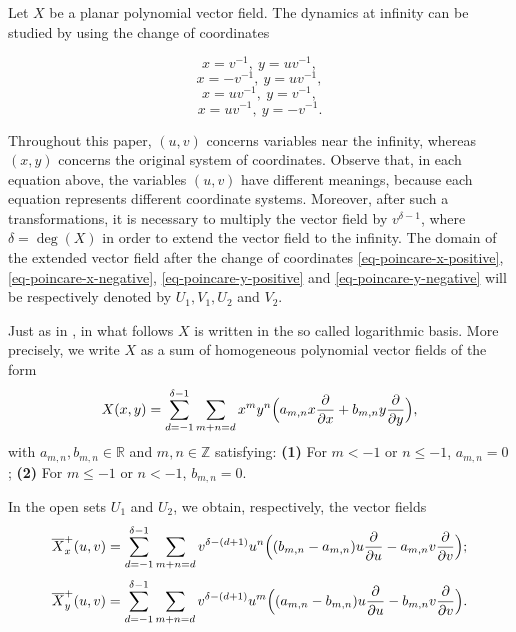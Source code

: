 \documentclass[12pt]{amsart}
\begin{document}
Let $X$ be a planar polynomial vector field. The dynamics at infinity can be studied by using the change of coordinates \begin{multicols}{2} \noindent\begin{equation}\label{eq-poincare-x-positive}
x = v^{-1}, \ y = uv^{-1},
\end{equation}
\begin{equation}\label{eq-poincare-x-negative}
x = -v^{-1}, \ y = uv^{-1},
\end{equation}
\begin{equation}\label{eq-poincare-y-positive}
x = uv^{-1}, \ y = v^{-1},
\end{equation}
\begin{equation}\label{eq-poincare-y-negative}
x = uv^{-1}, \ y = -v^{-1}.
\end{equation}\end{multicols}

Throughout this paper, $(u,v)$ concerns variables near the infinity, whereas $(x,y)$ concerns the original system of coordinates. Observe that, in each equation above, the variables $(u,v)$ have different meanings, because each equation represents different coordinate systems. Moreover, after such a transformations, it is necessary to multiply the vector field by $v^{\delta-1}$, where $\delta = \operatorname{deg}(X)$ in order to extend the vector field to the infinity. The domain of the extended vector field after the change of coordinates \eqref{eq-poincare-x-positive}, \eqref{eq-poincare-x-negative}, \eqref{eq-poincare-y-positive} and \eqref{eq-poincare-y-negative} will be respectively denoted by $U_{1}, V_{1}, U_{2}$ and $V_{2}$.

Just as in \cite{Panazzolo}, in what follows $X$ is written in the so called logarithmic basis. More precisely, we write $X$ as a sum of homogeneous polynomial vector fields of the form
$$X(x,y) = \displaystyle\sum_{d=-1}^{\delta -1}\sum_{m+n=d} x^{m}y^{n}\Big{(}a_{m,n}x\displaystyle\frac{\partial}{\partial x} + b_{m,n}y\displaystyle\frac{\partial}{\partial y}\Big{)},$$
with $a_{m,n},b_{m,n}\in\mathbb{R}$ and $m,n\in \mathbb{Z}$ satisfying: \textbf{(1)} For $m < -1$ or $n \leq -1$, $a_{m,n} = 0$; \textbf{(2) }For $m \leq -1$ or $n < -1$, $b_{m,n} = 0$. 


In the open sets $U_{1}$ and $U_{2}$, we obtain, respectively, the vector fields
\begin{equation}\label{eq-poincare-x-positive-vf}
\overline{X}_{x}^{+}(u,v) = \displaystyle\sum_{d=-1}^{\delta -1}\sum_{m+n=d} v^{\delta-(d+1)}u^{n}\Big{(}(b_{m,n}-a_{m,n})u\displaystyle\frac{\partial}{\partial u} - a_{m,n}v\displaystyle\frac{\partial}{\partial v}\Big{)};
\end{equation}
\begin{equation}\label{eq-poincare-y-positive-vf}
\overline{X}_{y}^{+}(u,v) = \displaystyle\sum_{d=-1}^{\delta -1}\sum_{m+n=d} v^{\delta-(d+1)}u^{m}\Big{(}(a_{m,n}-b_{m,n})u\displaystyle\frac{\partial}{\partial u} - b_{m,n}v\displaystyle\frac{\partial}{\partial v}\Big{)}.
\end{equation}
\end{document}
